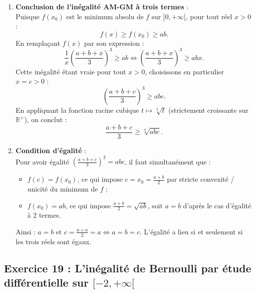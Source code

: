 \documentclass[11pt,a4paper]{article}
\newcommand{\R}{\mathbb{R}}
\begin{document}
\begin{correctionbox}
\begin{enumerate}[label=\textbf{\arabic*.}]
\begin{enumerate}[label=\alph*.]
        \item \textbf{Conclusion de l'inégalité AM-GM à trois termes} :\\
        Puisque $f(x_0)$ est le minimum absolu de $f$ sur $]0, +\infty[$, pour tout réel $x > 0$ :
        \[
        f(x) \ge f(x_0) \ge ab.
        \]
        En remplaçant $f(x)$ par son expression :
        \[
        \frac{1}{x} \left( \frac{a+b+x}{3} \right)^3 \ge ab \iff \left( \frac{a+b+x}{3} \right)^3 \ge abx.
        \]
        Cette inégalité étant vraie pour tout $x > 0$, choisissons en particulier $x = c > 0$ :
        \[
        \left( \frac{a+b+c}{3} \right)^3 \ge abc.
        \]
        En appliquant la fonction racine cubique $t \mapsto \sqrt[3]{t}$ (strictement croissante sur $\R^+$), on conclut :
        \[
        \frac{a+b+c}{3} \ge \sqrt[3]{abc}.
        \]

        \item \textbf{Condition d'égalité} :\\
        Pour avoir égalité $\left(\frac{a+b+c}{3}\right)^3 = abc$, il faut simultanément que :
        \begin{itemize}
            \item $f(c) = f(x_0)$, ce qui impose $c = x_0 = \frac{a+b}{2}$ par stricte convexité / unicité du minimum de $f$ ;
            \item $f(x_0) = ab$, ce qui impose $\frac{a+b}{2} = \sqrt{ab}$, soit $a = b$ d'après le cas d'égalité à 2 termes.
        \end{itemize}
        Ainsi : $a = b$ et $c = \frac{a+a}{2} = a \iff a = b = c$. L'égalité a lieu si et seulement si les trois réels sont égaux.
    \end{enumerate}
\end{enumerate}
\end{correctionbox}

\subsection*{Exercice 19 : L'inégalité de Bernoulli par étude différentielle sur $[-2, +\infty[$}
\end{document}
